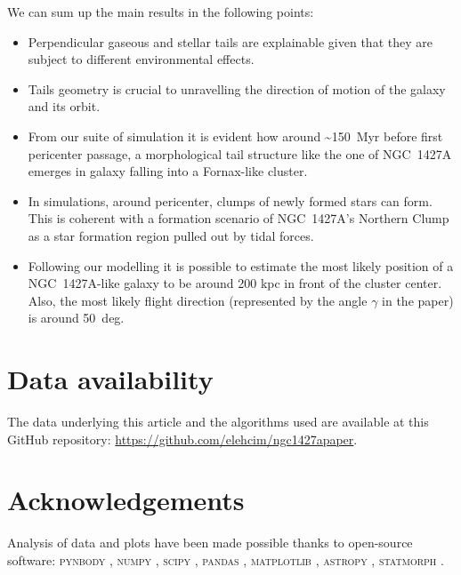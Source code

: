 We can sum up the main results in the following points:
\begin{itemize}
    \item Perpendicular gaseous and stellar tails are explainable given that they are subject to different environmental effects.
    \item Tails geometry is crucial to unravelling the direction of motion of the galaxy and its orbit.
    \item From our suite of simulation it is evident how around \textasciitilde 150~Myr before first pericenter passage, a morphological tail structure like the one of NGC~1427A emerges in galaxy falling into a Fornax-like cluster.
    \item In simulations, around pericenter, clumps of newly formed stars can form. This is coherent with a formation scenario of NGC~1427A's Northern Clump as a star formation region pulled out by tidal forces.
    \item Following our modelling it is possible to estimate the most likely position of a NGC~1427A-like galaxy to be around 200 kpc in front of the cluster center. Also, the most likely flight direction (represented by the angle $\gamma$ in the paper) is around 50~deg.
\end{itemize}

\section*{Data availability}
The data underlying this article and the algorithms used are available at this GitHub repository: \url{https://github.com/elehcim/ngc1427apaper}.

\section*{Acknowledgements}
Analysis of data and plots have been made possible thanks to open-source software:
\textsc{pynbody} \citep{Pontzen2013},
\textsc{numpy} \citep{numpy},
\textsc{scipy} \citep{scipy},
\textsc{pandas} \citep{pandas},
\textsc{matplotlib} \citep{Hunter2004},
\textsc{astropy} \citep{TheAstropyCollaboration2018},
\textsc{statmorph} \citep{Rodriguez-Gomez2019}.
